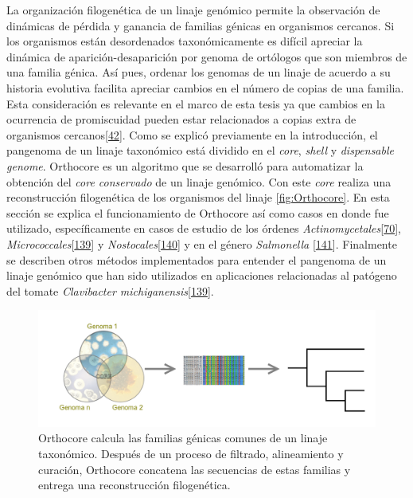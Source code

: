 \documentclass[12pt,twoside]{reedthesis}
\begin{document}
  La organización filogenética de un linaje genómico permite la
  observación de dinámicas de pérdida y ganancia de familias génicas en
  organismos cercanos. Si los organismos están desordenados
  taxonómicamente es difícil apreciar la dinámica de
  aparición-desaparición por genoma de ortólogos que son miembros de una
  familia génica. Así pues, ordenar los genomas de un linaje de acuerdo a
  su historia evolutiva facilita apreciar cambios en el número de copias
  de una familia. Esta consideración es relevante en el marco de esta
  tesis ya que cambios en la ocurrencia de promiscuidad pueden estar
  relacionados a copias extra de organismos
  cercanos{[}\protect\hyperlink{ref-verdel-aranda_molecular_2015}{42}{]}.
  Como se explicó previamente en la introducción, el pangenoma de un
  linaje taxonómico está dividido en el \emph{core}, \emph{shell} y
  \emph{dispensable} \emph{genome}. Orthocore es un algoritmo que se
  desarrolló para automatizar la obtención del \emph{core conservado} de
  un linaje genómico. Con este \emph{core} realiza una reconstrucción
  filogenética de los organismos del linaje \autoref{fig:Orthocore}. En
  esta sección se explica el funcionamiento de Orthocore así como casos en
  donde fue utilizado, específicamente en casos de estudio de los órdenes
  \emph{Actinomycetales}{[}\protect\hyperlink{ref-juarez-vazquez_evolution_2017}{70}{]},
  \emph{Micrococcales}{[}\protect\hyperlink{ref-rodriguez_tesis_2016}{139}{]}
  y
  \emph{Nostocales}{[}\protect\hyperlink{ref-gutierrez-garcia_cycad_2019}{140}{]}
  y en el género \emph{Salmonella}
  {[}\protect\hyperlink{ref-delgado-suarez_whole_2018}{141}{]}. Finalmente
  se describen otros métodos implementados para entender el pangenoma de
  un linaje genómico que han sido utilizados en aplicaciones relacionadas
  al patógeno del tomate \emph{Clavibacter
  michiganensis}{[}\protect\hyperlink{ref-rodriguez_tesis_2016}{139}{]}.
  
  \begin{figure}[h!tbp]
  \centering
  \includegraphics[angle = 0,scale = .44]{chapter1/coreWiki.png}
  \caption[Orthocore calcula el $core~genome$ de un linaje y construye con él una filogenia]{\footnotesize{Orthocore calcula las familias génicas comunes de un linaje taxonómico. Después de un proceso de filtrado, alineamiento y curación, Orthocore concatena las secuencias de estas familias y entrega una reconstrucción filogenética.}}
  \label{fig:Orthocore}
  \end{figure}
  
\end{document}
